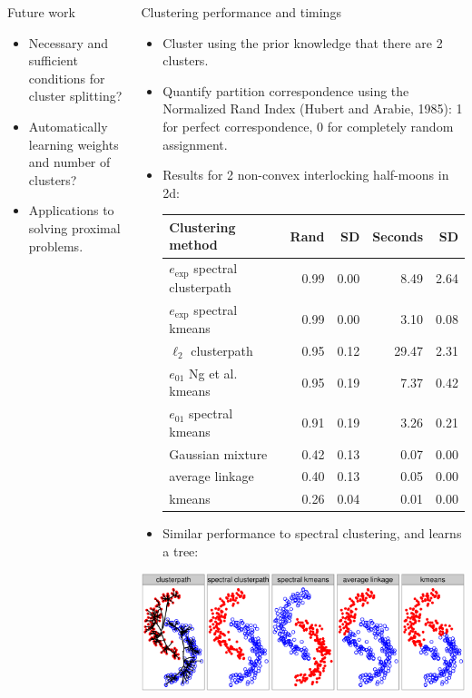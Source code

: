 \documentclass[final]{beamer}
\begin{document}
\begin{frame}{}
\begin{columns}[T]
\begin{column}{0.315\linewidth}
\begin{block}{Future work}
  \begin{itemize}
  \item Necessary and sufficient conditions for cluster splitting?
  \item Automatically learning weights and number of clusters?
  \item Applications to solving proximal problems.
  \end{itemize}
\end{block}
\end{column}\hfill
\begin{column}{0.315\linewidth}


\begin{block}{Clustering performance and timings}
\begin{itemize}
\item Cluster using the prior knowledge that there are 2 clusters.
\item Quantify partition correspondence using the Normalized Rand
  Index (Hubert and Arabie, 1985): 1 for perfect correspondence, 0 for
  completely random assignment.
\item Results for 2 non-convex interlocking half-moons in 2d:
\begin{center}
\begin{tabular}{lrrrr}
\hline
  Clustering method & Rand & SD & Seconds & SD \\ 
  \hline
  $e_{\exp}$ spectral clusterpath & 0.99 & 0.00 & 8.49 & 2.64 \\ 
  $e_{\exp}$ spectral kmeans & 0.99 & 0.00 & 3.10 & 0.08 \\ 
  $\ell_2$ clusterpath & 0.95 & 0.12 & 29.47 & 2.31 \\ 
  $e_{01}$ Ng et al. kmeans & 0.95 & 0.19 & 7.37 & 0.42 \\ 
  $e_{01}$ spectral kmeans & 0.91 & 0.19 & 3.26 & 0.21 \\ 
  Gaussian mixture & 0.42 & 0.13 & 0.07 & 0.00 \\
  average linkage & 0.40 & 0.13 & 0.05 & 0.00 \\ 
  kmeans & 0.26 & 0.04 & 0.01 & 0.00 \\ 
\hline
\end{tabular}
\end{center}
\item Similar performance to spectral clustering, and learns a tree:
\end{itemize}
\end{block}
\includegraphics[width=0.3\paperwidth]{moons}


\end{column}
\end{columns}
\end{frame}
\end{document}
